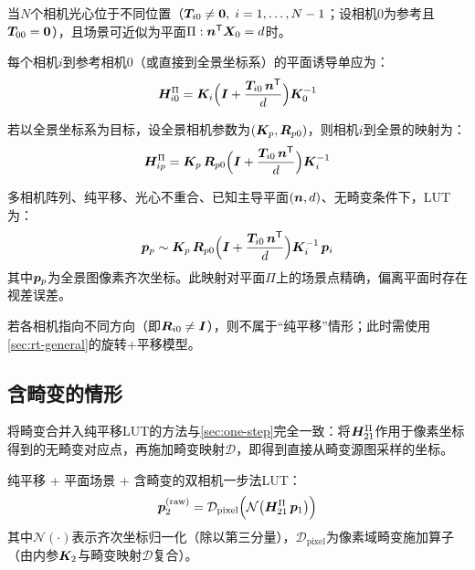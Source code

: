 当$N$个相机光心位于不同位置（$\bm{T}_{i0} \neq \bm{0},\; i=1,\dots,N-1$；设相机0为参考且$\bm{T}_{00}=\bm{0}$），且场景可近似为平面$\Pi: \bm{n}^{\mathsf{T}}\bm{X}_0 = d$时。

每个相机$i$到参考相机0（或直接到全景坐标系）的平面诱导单应为：
\begin{equation}
\bm{H}_{i0}^{\Pi} = \bm{K}_i\Bigl(\bm{I} + \frac{\bm{T}_{i0}\,\bm{n}^{\mathsf{T}}}{d}\Bigr)\bm{K}_0^{-1}
\label{eq:Hi0-plane}
\end{equation}

若以全景坐标系为目标，设全景相机参数为$(\bm{K}_p, \bm{R}_{p0})$，则相机$i$到全景的映射为：
\begin{equation}
\bm{H}_{ip}^{\Pi} = \bm{K}_p\,\bm{R}_{p0}
\Bigl(\bm{I} + \frac{\bm{T}_{i0}\,\bm{n}^{\mathsf{T}}}{d}\Bigr)\bm{K}_i^{-1}
\label{eq:Hip-plane}
\end{equation}

\begin{finalbox}
多相机阵列、纯平移、光心不重合、已知主导平面$(\bm{n}, d)$、无畸变条件下，LUT为：
\[
\bm{p}_p \sim \bm{K}_p\,\bm{R}_{p0}\Bigl(\bm{I} + \frac{\bm{T}_{i0}\,\bm{n}^{\mathsf{T}}}{d}\Bigr)\bm{K}_i^{-1}\,\bm{p}_i
\]
其中$\bm{p}_p$为全景图像素齐次坐标。此映射对平面$\Pi$上的场景点精确，偏离平面时存在视差误差。
\end{finalbox}

\begin{remark}
若各相机指向不同方向（即$\bm{R}_{i0} \neq \bm{I}$），则不属于“纯平移”情形；此时需使用\cref{sec:rt-general}的旋转+平移模型。
\end{remark}

\subsection{含畸变的情形}
\label{sec:trans-distort}

将畸变合并入纯平移LUT的方法与\cref{sec:one-step}完全一致：将$\bm{H}_{21}^{\Pi}$作用于像素坐标得到的无畸变对应点，再施加畸变映射$\mathcal{D}$，即得到直接从畸变源图采样的坐标。

\begin{finalbox}
纯平移 + 平面场景 + 含畸变的双相机一步法LUT：
\[
\bm{p}_2^{\text{(raw)}} =
\mathcal{D}_{\text{pixel}}\Bigl(
\mathcal{N}\bigl(\bm{H}_{21}^{\Pi}\,\bm{p}_1\bigr)
\Bigr)
\]
其中$\mathcal{N}(\cdot)$表示齐次坐标归一化（除以第三分量），$\mathcal{D}_{\text{pixel}}$为像素域畸变施加算子（由内参$\bm{K}_2$与畸变映射$\mathcal{D}$复合）。
\end{finalbox}
